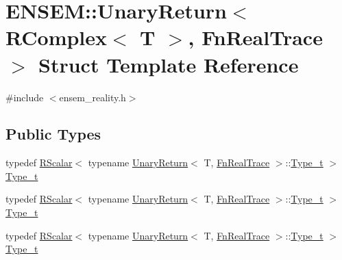 \hypertarget{structENSEM_1_1UnaryReturn_3_01RComplex_3_01T_01_4_00_01FnRealTrace_01_4}{}\section{E\+N\+S\+EM\+:\+:Unary\+Return$<$ R\+Complex$<$ T $>$, Fn\+Real\+Trace $>$ Struct Template Reference}
\label{structENSEM_1_1UnaryReturn_3_01RComplex_3_01T_01_4_00_01FnRealTrace_01_4}


{\ttfamily \#include $<$ensem\+\_\+reality.\+h$>$}

\subsection*{Public Types}
\begin{DoxyCompactItemize}
\item 
typedef \mbox{\hyperlink{classENSEM_1_1RScalar}{R\+Scalar}}$<$ typename \mbox{\hyperlink{structENSEM_1_1UnaryReturn}{Unary\+Return}}$<$ T, \mbox{\hyperlink{structENSEM_1_1FnRealTrace}{Fn\+Real\+Trace}} $>$\+::\mbox{\hyperlink{structENSEM_1_1UnaryReturn_3_01RComplex_3_01T_01_4_00_01FnRealTrace_01_4_abd4db6ffb0c49832943fdeb34185ec21}{Type\+\_\+t}} $>$ \mbox{\hyperlink{structENSEM_1_1UnaryReturn_3_01RComplex_3_01T_01_4_00_01FnRealTrace_01_4_abd4db6ffb0c49832943fdeb34185ec21}{Type\+\_\+t}}
\item 
typedef \mbox{\hyperlink{classENSEM_1_1RScalar}{R\+Scalar}}$<$ typename \mbox{\hyperlink{structENSEM_1_1UnaryReturn}{Unary\+Return}}$<$ T, \mbox{\hyperlink{structENSEM_1_1FnRealTrace}{Fn\+Real\+Trace}} $>$\+::\mbox{\hyperlink{structENSEM_1_1UnaryReturn_3_01RComplex_3_01T_01_4_00_01FnRealTrace_01_4_abd4db6ffb0c49832943fdeb34185ec21}{Type\+\_\+t}} $>$ \mbox{\hyperlink{structENSEM_1_1UnaryReturn_3_01RComplex_3_01T_01_4_00_01FnRealTrace_01_4_abd4db6ffb0c49832943fdeb34185ec21}{Type\+\_\+t}}
\item 
typedef \mbox{\hyperlink{classENSEM_1_1RScalar}{R\+Scalar}}$<$ typename \mbox{\hyperlink{structENSEM_1_1UnaryReturn}{Unary\+Return}}$<$ T, \mbox{\hyperlink{structENSEM_1_1FnRealTrace}{Fn\+Real\+Trace}} $>$\+::\mbox{\hyperlink{structENSEM_1_1UnaryReturn_3_01RComplex_3_01T_01_4_00_01FnRealTrace_01_4_abd4db6ffb0c49832943fdeb34185ec21}{Type\+\_\+t}} $>$ \mbox{\hyperlink{structENSEM_1_1UnaryReturn_3_01RComplex_3_01T_01_4_00_01FnRealTrace_01_4_abd4db6ffb0c49832943fdeb34185ec21}{Type\+\_\+t}}
\end{DoxyCompactItemize}


